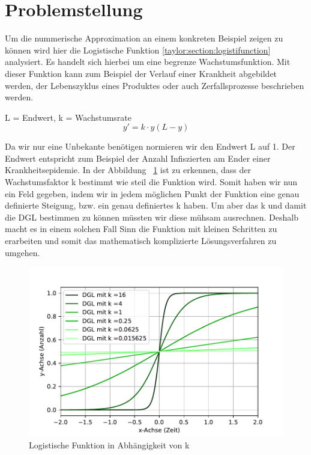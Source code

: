 %
%
%
\section{Problemstellung
\label{taylor:section:problemstellung}}
Um die nummerische Approximation an einem konkreten Beispiel zeigen zu können wird hier die Logistische Funktion \ref{taylor:section:logistifunction} analysiert.
Es handelt sich hierbei um eine begrenze Wachstumsfunktion. 
Mit dieser Funktion kann zum Beispiel der Verlauf einer Krankheit abgebildet werden, der Lebenszyklus eines Produktes oder auch Zerfallsprozesse beschrieben werden.

L = Endwert, k = Wachstumsrate
\begin{equation}
	y'
	=
	k\cdot y(L-y)
	\label{taylor:section:logistifunction}
\end{equation}

Da wir nur eine Unbekante benötigen normieren wir den Endwert L auf 1.
Der Endwert entspricht zum Beispiel der Anzahl Infiszierten am Ender einer Krankheitsepidemie.
In der Abbildung ~\ref{taylor:section:fig:DGLDarstellung} ist zu erkennen, dass der Wachstumsfaktor k bestimmt wie steil die Funktion wird.
Somit haben wir nun ein Feld gegeben, indem wir in jedem möglichen Punkt der Funktion eine genau definierte Steigung, bzw. ein genau definiertes k haben.
Um aber das k und damit die DGL bestimmen zu können müssten wir diese mühsam ausrechnen.
Deshalb macht es in einem solchen Fall Sinn die Funktion mit kleinen Schritten zu erarbeiten und somit das mathematisch komplizierte Lösungsverfahren zu umgehen.

\begin{figure}[h]
	\centering
	\includegraphics[width=12cm]{papers/taylor/taylorPictures/DGLDarstellung.pdf}
	\caption{Logistische Funktion in Abhängigkeit von k}
	\label{taylor:section:fig:DGLDarstellung}
\end{figure}

